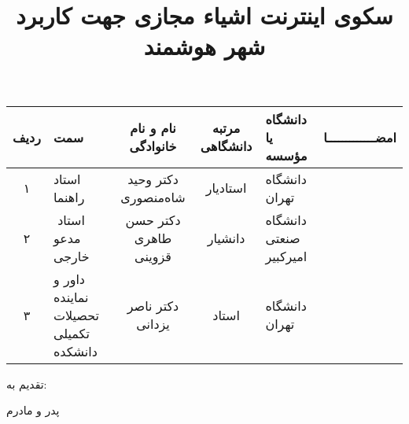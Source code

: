 \subject{مهندسی برق}

\title{سكوی اینترنت اشیاء مجازی جهت كاربرد شهر هوشمند}

\firstPage

\cleartorightpage
\besmPage

\cleartorightpage
\firstPage

\cleartorightpage
\davaranPage
\begin{center}
  \begin{tabular}{|c|p{30mm}|c|c|p{25mm}|c|}
    \hline
    ردیف	  & سمت                                           & نام و نام خانوادگی    & مرتبه \newline دانشگاهی &	دانشگاه یا مؤسسه               & امضـــــــــــــا \\
    \hline
    ۱       & استاد راهنما                                  & دکتر وحید شاه‌منصوری   & استاد‌یار                & دانشگاه تهران                   &                   \\
    \hline
    ۲       &‌ استاد مدعو خارجی                              & دکتر حسن طاهری قزوینی & دانشیار                 & دانشگاه \newline صنعتی امیرکبیر &                    \\
    \hline
    ۳       & داور و نماینده \newline تحصیلات تکمیلی دانشکده & دکتر ناصر یزدانی      & استاد                   & دانشگاه تهران                   &                    \\
    \hline
  \end{tabular}
\end{center}

\cleartorightpage
\esalatPage

\cleartorightpage
\thispagestyle{empty}
{\Large تقدیم به:} \\
\begin{flushleft}
  {
    \huge
    پدر و مادرم
  }
\end{flushleft}


